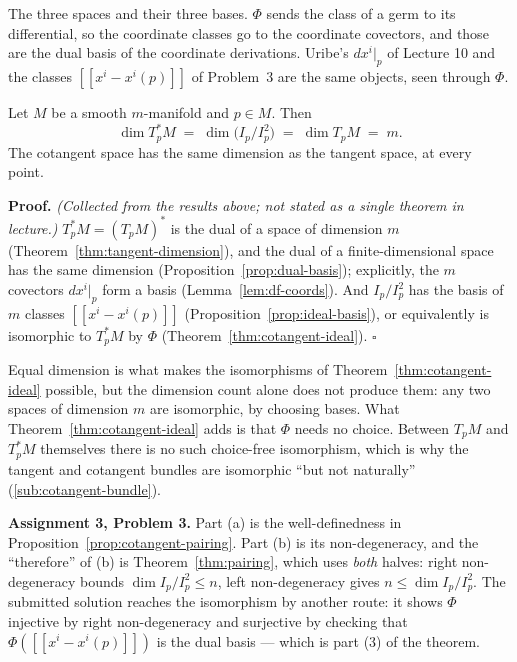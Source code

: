 \documentclass[11pt]{report}
\makeatletter
\newcounter{thmcounter}[section]
\renewenvironment{proof}[1][Proof]{\noindent\textbf{#1.} }{\hfill$\square$\par\vspace{5pt}}
\newcommand{\thmlabel}[1]{\edef\@currentlabel{\arabic{section}.\arabic{thmcounter}}\label{#1}}
\makeatother
\begin{document}
The three spaces and their three bases. $\Phi$ sends the class of a germ to its differential, so the coordinate classes go to the coordinate covectors, and those are the dual basis of the coordinate derivations. Uribe's $dx^i|_p$ of Lecture 10 and the classes $[[x^i - x^i(p)]]$ of Problem~3 are the same objects, seen through $\Phi$.

\begin{thmbox}\thmlabel{thm:cotangent-dimension}
Let $M$ be a smooth $m$-manifold and $p \in M$. Then
\[
\dim T_p^*M \;=\; \dim \big(I_p/I_p^2\big) \;=\; \dim T_pM \;=\; m .
\]
The cotangent space has the same dimension as the tangent space, at every point.
\end{thmbox}

\begin{proof}
\textit{(Collected from the results above; not stated as a single theorem in lecture.)} $T_p^*M = (T_pM)^*$ is the dual of a space of dimension $m$ (Theorem~\ref{thm:tangent-dimension}), and the dual of a finite-dimensional space has the same dimension (Proposition~\ref{prop:dual-basis}); explicitly, the $m$ covectors $dx^i|_p$ form a basis (Lemma~\ref{lem:df-coords}). And $I_p/I_p^2$ has the basis of $m$ classes $[[x^i - x^i(p)]]$ (Proposition~\ref{prop:ideal-basis}), or equivalently is isomorphic to $T_p^*M$ by $\Phi$ (Theorem~\ref{thm:cotangent-ideal}).
\end{proof}

Equal dimension is what makes the isomorphisms of Theorem~\ref{thm:cotangent-ideal} possible, but the dimension count alone does not produce them: any two spaces of dimension $m$ are isomorphic, by choosing bases. What Theorem~\ref{thm:cotangent-ideal} adds is that $\Phi$ needs no choice. Between $T_pM$ and $T_p^*M$ themselves there is no such choice-free isomorphism, which is why the tangent and cotangent bundles are isomorphic ``but not naturally'' (\ref{sub:cotangent-bundle}).

\textbf{Assignment 3, Problem 3.} Part (a) is the well-definedness in Proposition~\ref{prop:cotangent-pairing}. Part (b) is its non-degeneracy, and the ``therefore'' of (b) is Theorem~\ref{thm:pairing}, which uses \emph{both} halves: right non-degeneracy bounds $\dim I_p/I_p^2 \le n$, left non-degeneracy gives $n \le \dim I_p/I_p^2$. The submitted solution reaches the isomorphism by another route: it shows $\Phi$ injective by right non-degeneracy and surjective by checking that $\Phi([[x^i - x^i(p)]])$ is the dual basis --- which is part (3) of the theorem.
\end{document}
